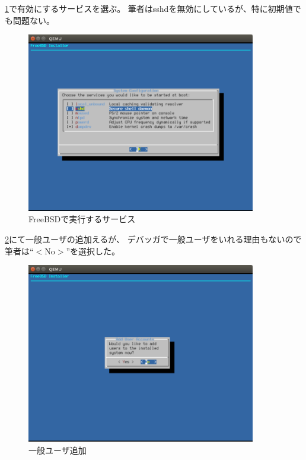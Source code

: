 \documentclass[a4j]{jarticle}
\begin{document}
\ref{fig:FreeBSD_Service}で有効にするサービスを選ぶ。
筆者はsshdを無効にしているが、特に初期値でも問題ない。
\begin{figure}[htbp]
	\begin{center}
    	\includegraphics[width=10cm]{./IMG/FreeBSD_SYS.png}
	\end{center}
    \caption{FreeBSDで実行するサービス}
    \label{fig:FreeBSD_Service}
\end{figure}

\ref{fig:FreeBSD_ADD_U}にて一般ユーザの追加えるが、
デバッガで一般ユーザをいれる理由もないので筆者は``$<$No$>$''を選択した。
\begin{figure}[htbp]
	\begin{center}
    	\includegraphics[width=10cm]{./IMG/FreeBSD_ADD_USER.png}
	\end{center}
    \caption{一般ユーザ追加}
    \label{fig:FreeBSD_ADD_U}
\end{figure}
\clearpage
\end{document}
